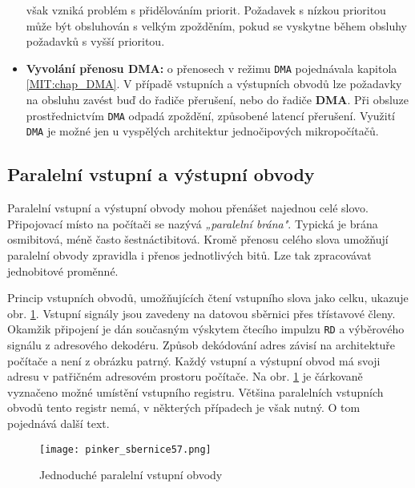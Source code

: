 \begin{itemize}[noitemsep]
               však vzniká problém s přidělováním priorit. Požadavek s nízkou prioritou 
               může být obsluhován s velkým zpožděním, pokud se vyskytne během obsluhy požadavků s 
               vyšší prioritou.
        \item  \textbf{Vyvolání přenosu DMA:} o přenosech v režimu \texttt{DMA} pojednávala  
               kapitola \ref{MIT:chap_DMA}. V případě vstupních a výstupních obvodů lze požadavky 
               na obsluhu zavést buď do řadiče přerušení, nebo do řadiče \textbf{DMA}. Při obsluze 
               prostřednictvím  \texttt{DMA} odpadá zpoždění, způsobené latencí přerušení. Využití 
               \texttt{DMA} je možné jen u vyspělých architektur jednočipových mikropočítačů.
      \end{itemize}
      
    \subsection{Paralelní vstupní a výstupní obvody}
      Paralelní vstupní a výstupní obvody mohou přenášet najednou celé slovo. Připojovací místo na 
      počítači se nazývá \emph{„paralelní brána"}. Typická je brána osmibitová, méně často 
      šestnáctibitová. Kromě přenosu celého slova umožňují paralelní obvody zpravidla i přenos 
      jednotlivých bitů. Lze tak zpracovávat jednobitové proměnné.
      
      Princip vstupních obvodů, umožňujících čtení vstupního slova jako celku, ukazuje obr. 
      \ref{MIT:fig_sbernice57}. Vstupní signály jsou zavedeny na datovou sběrnici přes třístavové 
      členy. Okamžik připojení je dán současným výskytem čtecího impulzu \texttt{RD} a výběrového 
      signálu z adresového dekodéru. Způsob dekódování adres závisí na architektuře počítače a není 
      z obrázku patrný. Každý vstupní a výstupní obvod má svoji adresu v patřičném adresovém 
      prostoru počítače. Na obr. \ref{MIT:fig_sbernice57} je čárkovaně vyznačeno možné umístění 
      vstupního registru. Většina paralelních vstupních obvodů tento registr nemá, v některých 
      případech je však nutný. O tom pojednává další text.
    
      \begin{figure}[ht!] %
        \centering
        \texttt{[image: pinker\_sbernice57.png]}
        \caption{Jednoduché paralelní vstupní obvody}
        \label{MIT:fig_sbernice57}
      \end{figure}
      
